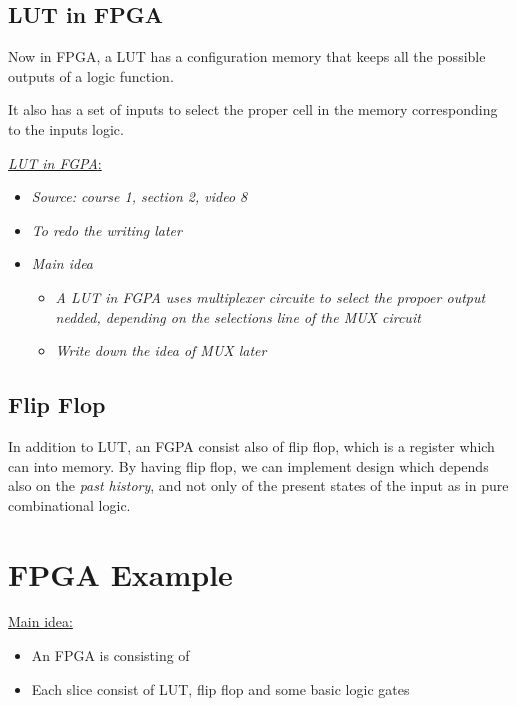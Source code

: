 \subsection{LUT in FPGA}

Now in FPGA, a LUT has a configuration memory that keeps all the possible outputs of a logic function.

It also has a set of inputs to select the proper cell in the memory corresponding to the inputs logic.

 \underline{\textit{LUT in FGPA}:}

\begin{itemize}

\item \textit{Source: course 1, section 2, video 8}

\item \textit{To redo the writing later}


\item \textit{Main idea}

	\begin{itemize}
	\item \textit{A LUT in FGPA uses multiplexer circuite to select the propoer output nedded, depending on the selections line of the MUX circuit}
	
	\item \textit{Write down the idea of MUX later}	
	
	\end{itemize}


\end{itemize}

\subsection{Flip Flop}
 
In addition to LUT, an FGPA consist also of flip flop, which is a register which can  into memory. By having flip flop, we can implement design which depends also on the \textit{past history}, and not only of the present states of the input as in pure combinational logic. 

\newpage 
\section{FPGA Example} 
 
\underline{Main idea:} 
 
\begin{itemize}

\item An FPGA is consisting of  

\item Each slice consist of LUT, flip flop and some basic logic gates

\end{itemize} 

